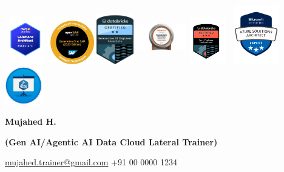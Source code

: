 \documentclass[a4paper]{article}
\begin{document}
\includegraphics[width=0.73668in,height=0.81548in]{media/image1.png}
\includegraphics[width=0.74287in,height=0.74561in]{media/image2.jpeg}
\includegraphics[width=0.62821in,height=0.87111in]{media/image3.png}
\includegraphics[width=0.87421in,height=0.92262in]{media/image4.png}
\includegraphics[width=0.60088in,height=0.8017in]{media/image5.png}
\includegraphics[width=0.99074in,height=1.01661in]{media/image6.png}
\includegraphics[width=0.65064in,height=0.65064in]{media/image7.png}

\begin{center}
  \textbf{Mujahed H.}\\[0.2cm]
\end{center}
\begin{center}
  \textbf{(Gen AI/Agentic AI Data Cloud Lateral Trainer)}
\end{center}
\begin{center}
  \href{mailto:mujahed.trainer@gmail.com}{mujahed.trainer@gmail.com} \textbar{} +91 00 0000 1234
\end{center}
\end{document}
